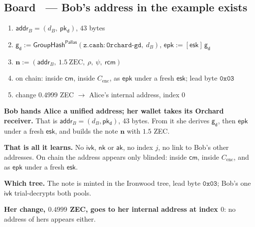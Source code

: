 \documentclass[11pt,a4paper]{article}
\makeatletter
\newcommand{\Pallas}{\ensuremath{\mathsf{Pallas}}}
\newcommand{\cmsym}{\ensuremath{\mathsf{cm}}}
\newcommand{\gd}{\ensuremath{\mathsf{g_d}}}
\newcommand{\pkd}{\ensuremath{\mathsf{pk_d}}}
\newcommand{\aksym}{\ensuremath{\mathsf{ak}}}
\newcommand{\nksym}{\ensuremath{\mathsf{nk}}}
\newcommand{\ivk}{\ensuremath{\mathsf{ivk}}}
\newcommand{\rcm}{\ensuremath{\mathsf{rcm}}}
\newcommand{\esk}{\ensuremath{\mathsf{esk}}}
\newcommand{\epk}{\ensuremath{\mathsf{epk}}}
\newcommand{\GroupHash}{\ensuremath{\mathsf{GroupHash}}}
\newcounter{board}
\newenvironment{board}[2]{\stepcounter{board}%
  \subsection*{Board \theboard\ --- #1 \hfill {\normalfont\small\color{arb}#2}}}{\medskip}
\newcommand{\Write}{\draw@head{Write}}
\newcommand{\Say}{\draw@head{Say}}
\makeatother
\begin{document}
\begin{board}{Bob's address in the example}{exists}
\Write
\begin{enumerate}
  \item $\mathsf{addr}_B = (d_B,\ \pkd)$, $43$ bytes
  \item $\gd := \GroupHash^{\Pallas}(\mathtt{z.cash:Orchard\text{-}gd},\
    d_B)$, \quad $\epk := [\esk]\,\gd$
  \item $\mathbf{n} := (\mathsf{addr}_B,\ 1.5\ \text{ZEC},\ \rho,\ \psi,\
    \rcm)$
  \item on chain: inside \cmsym, inside $C_{\mathrm{enc}}$, as \epk{}
    under a fresh \esk; lead byte $\mathtt{0x03}$
  \item change $0.4999$ ZEC $\to$ Alice's internal address, index $0$
\end{enumerate}
\Say
\textbf{Bob hands Alice a unified address; her wallet takes its Orchard
receiver.} That is $\mathsf{addr}_B = (d_B, \pkd)$, 43 bytes. From it she
derives \gd, then \epk{} under a fresh \esk, and builds the note
$\mathbf{n}$ with $1.5$ ZEC.

\textbf{That is all it learns.} No \ivk, \nksym{} or \aksym, no index
$j$, no link to Bob's other addresses. On chain the address appears only
blinded: inside \cmsym, inside $C_{\mathrm{enc}}$, and as \epk{} under a
fresh \esk.

\textbf{Which tree.} The note is minted in the Ironwood tree, lead byte
$\mathtt{0x03}$; Bob's one \ivk{} trial-decrypts both pools.

\textbf{Her change, $0.4999$ ZEC, goes to her internal address at index
$0$}: no address of hers appears either.


\end{board}
\end{document}
